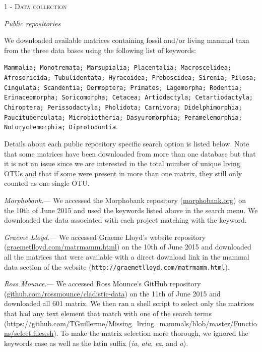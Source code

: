\documentclass[12pt,letterpaper]{article}
\renewcommand{\section}[1]{%
\bigskip
\begin{center}
\begin{Large}
\normalfont\scshape #1
\medskip
\end{Large}
\end{center}}
\renewcommand{\subsection}[1]{%
\bigskip
\begin{center}
\begin{large}
\normalfont\itshape #1
\end{large}
\end{center}}
\renewcommand{\subsubsection}[1]{%
\vspace{2ex}
\noindent
\textit{#1.}---}
\begin{document}
\section{1 - Data collection}
\subsection{Public repositories}
We downloaded available matrices containing fossil and/or living mammal taxa from the three data bases using the following list of keywords:

\texttt{Mammalia; Monotremata; Marsupialia; Placentalia; Macroscelidea; Afrosoricida; Tubulidentata; Hyracoidea; Proboscidea; Sirenia; Pilosa; Cingulata; Scandentia; Dermoptera; Primates; Lagomorpha; Rodentia; Erinaceomorpha; Soricomorpha; Cetacea; Artiodactyla; Cetartiodactyla; Chiroptera; Perissodactyla; Pholidota; Carnivora; Didelphimorphia; Paucituberculata; Microbiotheria; Dasyuromorphia; Peramelemorphia; Notoryctemorphia; Diprotodontia}.

Details about each public repository specific search option is listed below.
Note that some matrices have been downloaded from more than one database but that it is not an issue since we are interested in the total number of unique living OTUs and that if some were present in more than one matrix, they still only counted as one single OTU.

\subsubsection{Morphobank}
We accessed the Morphobank repository (\url{morphobank.org}) on the 10th of June 2015 and used the keywords listed above in the search menu.
We downloaded the data associated with each project matching with the keyword.

\subsubsection{Graeme Lloyd}
We accessed Graeme Lloyd's website repository (\url{graemetlloyd.com/matrmamm.html}) on the 10th of June 2015 and downloaded all the matrices that were available with a direct download link in the mammal data section of the website (\texttt{http://graemetlloyd.com/matrmamm.html}).

\subsubsection{Ross Mounce}
We accessed Ross Mounce's GitHub repository (\url{github.com/rossmounce/cladistic-data}) on the 11th of June 2015 and downloaded all 601 matrix.
We then ran a shell script to select only the matrices that had any text element that match with one of the search terms (\url{https://github.com/TGuillerme/Missing_living_mammals/blob/master/Functions/select.files.sh}).
To make the matrix selection more thorough, we ignored the keywords case as well as the latin suffix (\textit{ia}, \textit{ata}, \textit{ea}, and \textit{a}).
\end{document}
